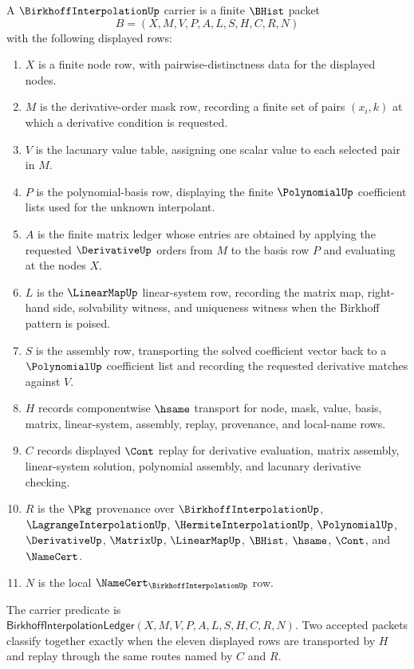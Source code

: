 \begin{definition}
\label{def:birkhoff-interpolation-carrier}
A $\BirkhoffInterpolationUp$ carrier is a finite $\BHist$ packet
$$
B=(X,M,V,P,A,L,S,H,C,R,N)
$$
with the following displayed rows:
\begin{enumerate}
\item $X$ is a finite node row, with pairwise-distinctness data for the displayed nodes.
\item $M$ is the derivative-order mask row, recording a finite set of pairs $(x_i,k)$ at which a derivative condition is requested.
\item $V$ is the lacunary value table, assigning one scalar value to each selected pair in $M$.
\item $P$ is the polynomial-basis row, displaying the finite $\PolynomialUp$ coefficient lists used for the unknown interpolant.
\item $A$ is the finite matrix ledger whose entries are obtained by applying the requested $\DerivativeUp$ orders from $M$ to the basis row $P$ and evaluating at the nodes $X$.
\item $L$ is the $\LinearMapUp$ linear-system row, recording the matrix map, right-hand side, solvability witness, and uniqueness witness when the Birkhoff pattern is poised.
\item $S$ is the assembly row, transporting the solved coefficient vector back to a $\PolynomialUp$ coefficient list and recording the requested derivative matches against $V$.
\item $H$ records componentwise $\hsame$ transport for node, mask, value, basis, matrix, linear-system, assembly, replay, provenance, and local-name rows.
\item $C$ records displayed $\Cont$ replay for derivative evaluation, matrix assembly, linear-system solution, polynomial assembly, and lacunary derivative checking.
\item $R$ is the $\Pkg$ provenance over $\BirkhoffInterpolationUp$, $\LagrangeInterpolationUp$, $\HermiteInterpolationUp$, $\PolynomialUp$, $\DerivativeUp$, $\MatrixUp$, $\LinearMapUp$, $\BHist$, $\hsame$, $\Cont$, and $\NameCert$.
\item $N$ is the local $\NameCert_{\BirkhoffInterpolationUp}$ row.
\end{enumerate}
The carrier predicate is $\mathsf{BirkhoffInterpolationLedger}(X,M,V,P,A,L,S,H,C,R,N)$. Two accepted packets classify together exactly when the eleven displayed rows are transported by $H$ and replay through the same routes named by $C$ and $R$.
\end{definition}

